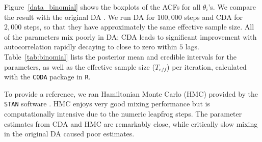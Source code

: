 \documentclass[10pt]{article}
\begin{document}
Figure~\ref{data_binomial} shows the boxplots of the ACFs for all $\theta_i$'s. We compare the result with the original DA \citep{polson2013bayesian}. We run DA for $100,000$ steps and CDA for $2,000$ steps, so that they have approximately the same effective sample size. All of the parameters mix poorly in DA; CDA leads to significant improvement with autocorrelation rapidly decaying to close to zero within $5$ lags. Table~\ref{tab:binomial} lists the posterior mean and credible intervals for the parameters, as well as the effective sample size ($T_{eff}$) per iteration, calculated with the \texttt{CODA} package in \texttt{R}.

 To provide a reference, we ran Hamiltonian Monte Carlo (HMC) provided by the \texttt{STAN} software \citep{carpenter2016stan}. HMC enjoys very good mixing performance but is computationally intensive due to the numeric leapfrog steps. The parameter estimates from CDA and HMC are remarkably close, while critically slow mixing in the original DA caused poor estimates.
\end{document}
